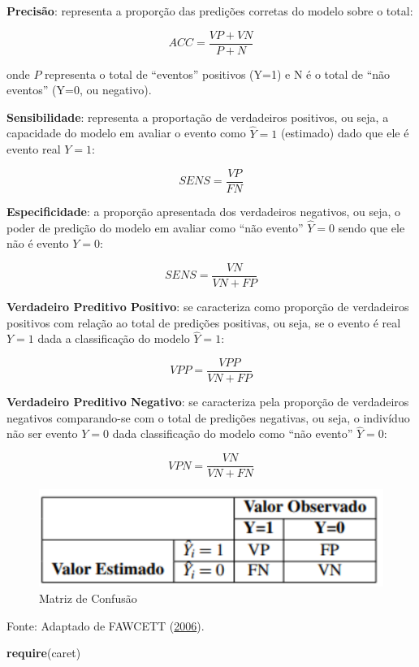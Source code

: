 \documentclass[12pt,brazil,]{book}
\newenvironment{Shaded}{\begin{snugshade}}{\end{snugshade}}
\newcommand{\KeywordTok}[1]{\textcolor[rgb]{0.13,0.29,0.53}{\textbf{#1}}}
\newcommand{\NormalTok}[1]{#1}
\begin{document}
\textbf{Precisão}: representa a proporção das predições corretas do
modelo sobre o total:

\[
ACC=\frac{VP+VN}{P+N}
\]

onde \(P\) representa o total de ``eventos'' positivos (Y=1) e N é o
total de ``não eventos'' (Y=0, ou negativo).

\textbf{Sensibilidade}: representa a proportação de verdadeiros
positivos, ou seja, a capacidade do modelo em avaliar o evento como
\(\hat Y=1\) (estimado) dado que ele é evento real \(Y=1\):

\[
SENS=\frac{VP}{FN}
\]

\textbf{Especificidade}: a proporção apresentada dos verdadeiros
negativos, ou seja, o poder de predição do modelo em avaliar como ``não
evento'' \(\hat Y=0\) sendo que ele não é evento \(Y=0\):

\[
SENS=\frac{VN}{VN+FP}
\]

\textbf{Verdadeiro Preditivo Positivo}: se caracteriza como proporção de
verdadeiros positivos com relação ao total de predições positivas, ou
seja, se o evento é real \(Y=1\) dada a classificação do modelo
\(\hat Y=1\):

\[
VPP=\frac{VPP}{VN+FP}
\]

\textbf{Verdadeiro Preditivo Negativo}: se caracteriza pela proporção de
verdadeiros negativos comparando-se com o total de predições negativas,
ou seja, o indivíduo não ser evento \(Y=0\) dada classificação do modelo
como ``não evento'' \(\hat Y=0\):

\[
VPN=\frac{VN}{VN+FN}
\]

\begin{figure}
\centering
\includegraphics{matriz.png}
\caption{Matriz de Confusão}
\end{figure}

Fonte: Adaptado de FAWCETT (\protect\hyperlink{ref-Fawcett2006}{2006}).

\begin{Shaded}
\begin{Highlighting}[]
\KeywordTok{require}\NormalTok{(caret)}
\end{Highlighting}
\end{Shaded}
\end{document}

